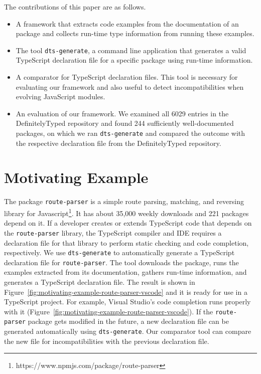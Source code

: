 \documentclass[a4paper,english,cleveref, autoref]{lipics-v2019}
\newcommand{\figref}[1]{Figure~\ref{#1}}
\begin{document}
The contributions of this paper are as follows.
\begin{itemize}
\item A framework that extracts code examples from the
  documentation of an \NPM{} package and collects run-time type
  information from running these examples.

\item The tool \texttt{dts-generate}, a command line
  application that generates a valid TypeScript declaration file for a
  specific \NPM{} package using run-time information.

\item A comparator for TypeScript declaration files. This tool is
  necessary for evaluating our framework and also useful to detect
  incompatibilities when evolving JavaScript modules.
\item An evaluation of our framework. We examined all 6029 entries in
  the DefinitelyTyped repository and found 244 sufficiently
  well-documented \NPM{} packages, on which we ran \texttt{dts-generate}
  and compared the outcome with the respective declaration file from the
  DefinitelyTyped repository. 

\end{itemize}

\section{Motivating Example}
\label{sec:motivating-example}
The \NPM{} package \texttt{route-parser} is a simple route parsing,
matching, and reversing library for
Javascript\footnote{https://www.npmjs.com/package/route-parser}. It
has about 35,000 weekly downloads and 221 \NPM{} packages depend on it. If
a developer creates or extends TypeScript code that depends on the
\texttt{route-parser} library, the TypeScript
compiler and IDE requires a declaration file for that library to
perform static checking and code completion, respectively. We 
use \texttt{dts-generate} to automatically generate a TypeScript
declaration file for \texttt{route-parser}. The tool downloads the \NPM{} 
package, runs the examples extracted from its documentation, gathers
run-time information, and generates a TypeScript declaration
file. The result is 
shown in \figref{fig:motivating-example-route-parser-vscode} and it is
ready for use in a TypeScript project. For example,  Visual Studio's
code completion runs properly with it
(\figref{fig:motivating-example-route-parser-vscode}). If the
\texttt{route-parser} package gets modified in the future, a new declaration
file can be generated automatically using
\texttt{dts-generate}. Our comparator tool can compare the new file
for incompatibilities with the previous declaration file.
\end{document}
